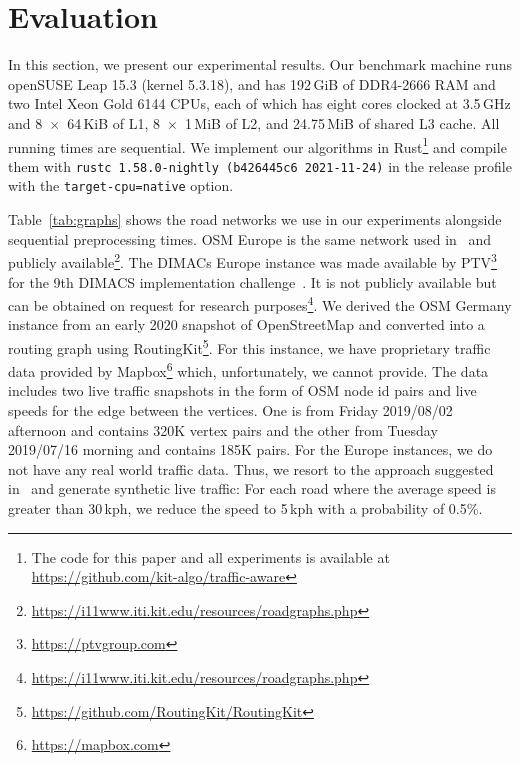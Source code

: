 \documentclass[a4paper,UKenglish,cleveref, autoref, thm-restate]{lipics-v2021}
\begin{document}
\section{Evaluation}\label{sec:eval}

In this section, we present our experimental results.
Our benchmark machine runs openSUSE Leap 15.3 (kernel 5.3.18), and has 192\,GiB of DDR4-2666 RAM and two Intel Xeon Gold 6144 CPUs, each of which has eight cores clocked at 3.5\,GHz and 8~$\times$~64\,KiB of L1, 8~$\times$~1\,MiB of L2, and 24.75\,MiB of shared L3 cache.
All running times are sequential.
We implement our algorithms in Rust\footnote{The code for this paper and all experiments is available at \url{https://github.com/kit-algo/traffic-aware}} and compile them with \texttt{rustc 1.58.0-nightly (b426445c6 2021-11-24)} in the release profile with the \texttt{target-cpu=native} option.

\begin{table}
\centering
\caption{
Instances used in the evaluation with sequential preprocessing running times to construct a CCH-Potential.
Phase 1 needs to be run only once for each graph, Phase 2 once for each weight function, or when a weight function changes.
}\label{tab:graphs}

\end{table}

Table~\ref{tab:graphs} shows the road networks we use in our experiments alongside sequential preprocessing times.
OSM Europe is the same network used in~\cite{dss-tarrn-18} and publicly available\footnote{\url{https://i11www.iti.kit.edu/resources/roadgraphs.php}}.
The DIMACs Europe instance was made available by PTV\footnote{\url{https://ptvgroup.com}} for the 9th DIMACS implementation challenge~\cite{DemetrescuGJ09}.
It is not publicly available but can be obtained on request for research purposes\footnote{\url{https://i11www.iti.kit.edu/resources/roadgraphs.php}}.
We derived the OSM Germany instance from an early 2020 snapshot of OpenStreetMap and converted into a routing graph using RoutingKit\footnote{\url{https://github.com/RoutingKit/RoutingKit}}.
For this instance, we have proprietary traffic data provided by Mapbox\footnote{\url{https://mapbox.com}} which, unfortunately, we cannot provide.
The data includes two live traffic snapshots in the form of OSM node id pairs and live speeds for the edge between the vertices.
One is from Friday 2019/08/02 afternoon and contains 320K vertex pairs and the other from Tuesday 2019/07/16 morning and contains 185K pairs.
For the Europe instances, we do not have any real world traffic data.
Thus, we resort to the approach suggested in~\cite{dss-tarrn-18} and generate synthetic live traffic:
For each road where the average speed is greater than 30\,kph, we reduce the speed to 5\,kph with a probability of 0.5\%.
\end{document}
